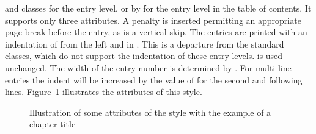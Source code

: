 \begin{description}
   and  classes for the  entry
  level, or by  for the  entry level in the
  table of contents. It supports only three attributes. A penalty is inserted permitting
  an appropriate page break before the entry, as is a vertical skip. The
  entries are printed with an indentation of  from the left and
  in . This is a departure from the standard classes, which do
  not support the indentation of these entry levels.
   is used unchanged. The width of the
  entry number is determined by . For multi-line entries the
  indent will be increased by the value of  for the second
  and following lines. \hyperref[fig:tocbasic.undottedtocline]%
  {Figure~\ref*{fig:tocbasic.undottedtocline}} illustrates the attributes of
  this style.
  \begin{figure}
    \centering
    \caption{Illustration of some attributes of the 
      style with the example of a chapter title}%
    \label{fig:tocbasic.undottedtocline}
  \end{figure}
\end{description}
